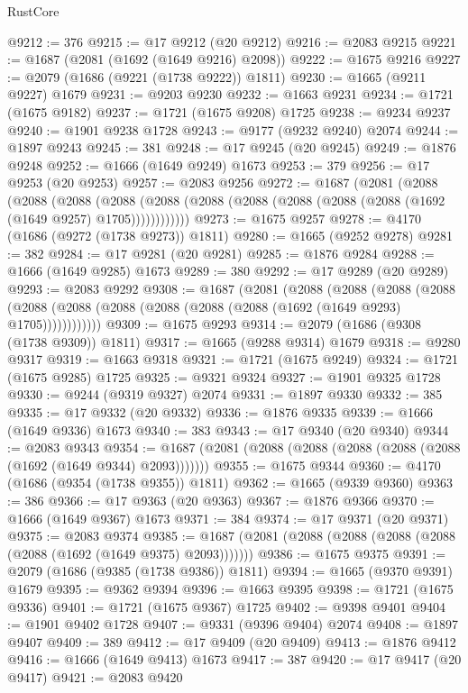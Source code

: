 \begin{lexlean}{RustCore}
\begin{coremodule}
@9212 := 376
@9215 := @17 @9212 (@20 @9212)
@9216 := @2083 @9215
@9221 := @1687 (@2081 (@1692 (@1649 @9216) @2098))
@9222 := @1675 @9216
@9227 := @2079 (@1686 (@9221 (@1738 @9222)) @1811)
@9230 := @1665 (@9211 @9227) @1679
@9231 := @9203 @9230
@9232 := @1663 @9231
@9234 := @1721 (@1675 @9182)
@9237 := @1721 (@1675 @9208) @1725
@9238 := @9234 @9237
@9240 := @1901 @9238 @1728
@9243 := @9177 (@9232 @9240) @2074
@9244 := @1897 @9243
@9245 := 381
@9248 := @17 @9245 (@20 @9245)
@9249 := @1876 @9248
@9252 := @1666 (@1649 @9249) @1673
@9253 := 379
@9256 := @17 @9253 (@20 @9253)
@9257 := @2083 @9256
@9272 := @1687
    (@2081
      (@2088
        (@2088
          (@2088
            (@2088 (@2088 (@2088 (@2088 (@2088 (@2088 (@2088 (@1692 (@1649 @9257) @1705))))))))))))
@9273 := @1675 @9257
@9278 := @4170 (@1686 (@9272 (@1738 @9273)) @1811)
@9280 := @1665 (@9252 @9278)
@9281 := 382
@9284 := @17 @9281 (@20 @9281)
@9285 := @1876 @9284
@9288 := @1666 (@1649 @9285) @1673
@9289 := 380
@9292 := @17 @9289 (@20 @9289)
@9293 := @2083 @9292
@9308 := @1687
    (@2081
      (@2088
        (@2088
          (@2088
            (@2088 (@2088 (@2088 (@2088 (@2088 (@2088 (@2088 (@1692 (@1649 @9293) @1705))))))))))))
@9309 := @1675 @9293
@9314 := @2079 (@1686 (@9308 (@1738 @9309)) @1811)
@9317 := @1665 (@9288 @9314) @1679
@9318 := @9280 @9317
@9319 := @1663 @9318
@9321 := @1721 (@1675 @9249)
@9324 := @1721 (@1675 @9285) @1725
@9325 := @9321 @9324
@9327 := @1901 @9325 @1728
@9330 := @9244 (@9319 @9327) @2074
@9331 := @1897 @9330
@9332 := 385
@9335 := @17 @9332 (@20 @9332)
@9336 := @1876 @9335
@9339 := @1666 (@1649 @9336) @1673
@9340 := 383
@9343 := @17 @9340 (@20 @9340)
@9344 := @2083 @9343
@9354 := @1687 (@2081 (@2088 (@2088 (@2088 (@2088 (@2088 (@1692 (@1649 @9344) @2093)))))))
@9355 := @1675 @9344
@9360 := @4170 (@1686 (@9354 (@1738 @9355)) @1811)
@9362 := @1665 (@9339 @9360)
@9363 := 386
@9366 := @17 @9363 (@20 @9363)
@9367 := @1876 @9366
@9370 := @1666 (@1649 @9367) @1673
@9371 := 384
@9374 := @17 @9371 (@20 @9371)
@9375 := @2083 @9374
@9385 := @1687 (@2081 (@2088 (@2088 (@2088 (@2088 (@2088 (@1692 (@1649 @9375) @2093)))))))
@9386 := @1675 @9375
@9391 := @2079 (@1686 (@9385 (@1738 @9386)) @1811)
@9394 := @1665 (@9370 @9391) @1679
@9395 := @9362 @9394
@9396 := @1663 @9395
@9398 := @1721 (@1675 @9336)
@9401 := @1721 (@1675 @9367) @1725
@9402 := @9398 @9401
@9404 := @1901 @9402 @1728
@9407 := @9331 (@9396 @9404) @2074
@9408 := @1897 @9407
@9409 := 389
@9412 := @17 @9409 (@20 @9409)
@9413 := @1876 @9412
@9416 := @1666 (@1649 @9413) @1673
@9417 := 387
@9420 := @17 @9417 (@20 @9417)
@9421 := @2083 @9420

\end{coremodule}
\end{lexlean}
